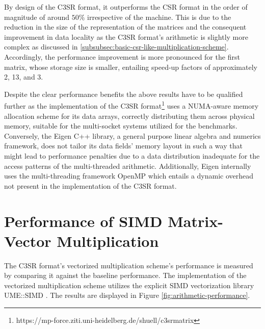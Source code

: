     By design of the C3SR format, it outperforms the CSR format in the order of magnitude of around $50\%$ irrespective of the machine. This is due to the reduction in the size of the representation of the matrices and the consequent improvement in data locality as the C3SR format's arithmetic is slightly more complex as discussed in \ref{subsubsec:basic-csr-like-multiplication-scheme}. Accordingly, the performance improvement is more pronounced for the first matrix, whose storage size is smaller, entailing speed-up factors of approximately 2, 13, and 3.

    Despite the clear performance benefits the above results have to be qualified further as the implementation of the C3SR format\footnote{https://mp-force.ziti.uni-heidelberg.de/shuell/c3srmatrix} uses a NUMA-aware memory allocation scheme for its data arrays, correctly distributing them across physical memory, suitable for the multi-socket systems utilized for the benchmarks. Conversely, the Eigen C++ library, a general purpose linear algebra and numerics framework, does not tailor its data fields' memory layout in such a way that might lead to performance penalties due to a data distribution inadequate for the access patterns of the multi-threaded arithmetic. Additionally, Eigen internally uses the multi-threading framework OpenMP \cite{openmp:website} which entails a dynamic overhead not present in the implementation of the C3SR format.

  \section{Performance of SIMD Matrix-Vector Multiplication}

    The C3SR format's vectorized multiplication scheme's performance is measured by comparing it against the baseline performance. The implementation of the vectorized multiplication scheme utilizes the explicit SIMD vectorization library UME::SIMD \cite{umesimd2017}. The results are displayed in Figure \ref{fig:arithmetic-performance}.

